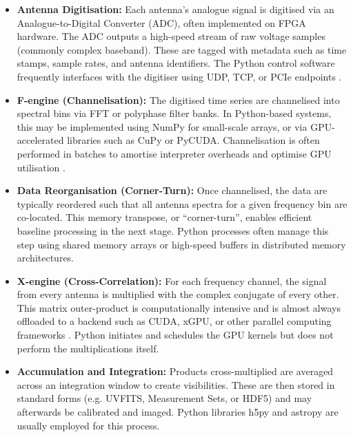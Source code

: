     \begin{itemize}
      \item \textbf{Antenna Digitisation:} Each antenna’s analogue signal is digitised via an Analogue-to-Digital Converter (ADC), often implemented on FPGA hardware. The ADC outputs a high-speed stream of raw voltage samples (commonly complex baseband). These are tagged with metadata such as time stamps, sample rates, and antenna identifiers. The Python control software frequently interfaces with the digitiser using UDP, TCP, or PCIe endpoints \cite{Gorthi2021}.
    
      \item \textbf{F-engine (Channelisation):} The digitised time series are channelised into spectral bins via FFT or polyphase filter banks. In Python-based systems, this may be implemented using NumPy for small-scale arrays, or via GPU-accelerated libraries such as CuPy or PyCUDA. Channelisation is often performed in batches to amortise interpreter overheads and optimise GPU utilisation \cite{Merry2023}.
    
      \item \textbf{Data Reorganisation (Corner-Turn):} Once channelised, the data are typically reordered such that all antenna spectra for a given frequency bin are co-located. This memory transpose, or ``corner-turn'', enables efficient baseline processing in the next stage. Python processes often manage this step using shared memory arrays or high-speed buffers in distributed memory architectures.
    
      \item \textbf{X-engine (Cross-Correlation):} For each frequency channel, the signal from every antenna is multiplied with the complex conjugate of every other. This matrix outer-product is computationally intensive and is almost always offloaded to a backend such as CUDA, xGPU, or other parallel computing frameworks \cite{Romein2021}. Python initiates and schedules the GPU kernels but does not perform the multiplications itself.
    
      \item \textbf{Accumulation and Integration:} Products cross-multiplied are averaged across an integration window to create visibilities. These are then stored in standard forms (e.g. UVFITS, Measurement Sets, or HDF5) and may afterwards be calibrated and imaged. Python libraries h5py and astropy are usually employed for this process.
    \end{itemize}

